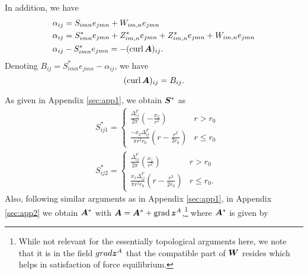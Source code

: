 \documentclass[11pt,letterpaper]{article}
\begin{document}
In addition, we have
\begin{eqnarray}\label{eqn:relation_A_S}
&\alpha_{ij} = S_{imn}e_{jmn} + W_{im,n}e_{jmn}  \nonumber \\ 
&\alpha_{ij} = S^*_{imn}e_{jmn} + Z^*_{im,n}e_{jmn}+Z^s_{im,n}e_{jmn}+W_{im,n}e_{jmn} \nonumber \\
&\alpha_{ij} - S^{*}_{imn}e_{jmn} = -(\curl\bfA)_{ij}.
\end{eqnarray}
Denoting $B_{ij} = S^{*}_{imn}e_{jmn} - \alpha_{ij}$, we have
\begin{equation*}
(\curl \bfA)_{ij} = B_{ij}.
\end{equation*}

As given in Appendix \ref{sec:app1},  we obtain $\bfS^{*}$ as 
 \begin{eqnarray*}
&S^{*}_{ij1} =
\begin{cases}
\frac{\Delta^F_{ij}}{2\pi}(-\frac{x_2}{r^2}) & r>r_0 \\
\frac{-x_2 \Delta^F_{ij}}{\pi r^2 r_0} (r-\frac{r^2}{2r_0}) & r \le r_0
\end{cases} \\
&S^{*}_{ij2} =
\begin{cases}
\frac{\Delta^F_{ij}}{2\pi}(\frac{x_1}{r^2}) & r>r_0 \\
\frac{x_1 \Delta^F_{ij}}{\pi r^2 r_0} (r-\frac{r^2}{2r_0})& r \le r_0.
\end{cases}
\end{eqnarray*}
Also, following similar arguments as in  Appendix \ref{sec:app1}, in Appendix \ref{sec:app2} we obtain $\bfA^*$ with $\bfA=\bfA^{*}+\grad \bfz^A$,\footnote{
While not relevant for the essentially topological arguments here, we note that it is in the field $grad\bfz^A$ that the compatible part of $\bfW$ resides which helps in satisfaction of force equilibrium.
} where $\bfA^{*}$ is given by 
\end{document}
